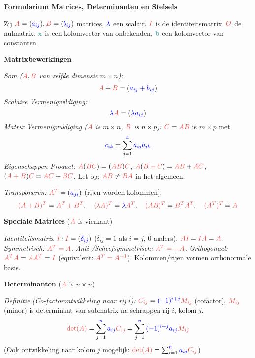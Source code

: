 \documentclass[12pt]{article}
\renewcommand{\vec}[1]{\textcolor{vectorTeal}{\mathbf{#1}}}
\newcommand{\scalar}[1]{\textcolor{scalarBrightBlue}{#1}}
\newcommand{\mat}[1]{\textcolor{matrixSoftRed}{#1}}
\begin{document}
\begin{center}
\Large \textbf{Formularium Matrices, Determinanten en Stelsels}
\end{center}

\vspace{1em} %

Zij $\mat{A} = (\scalar{a_{ij}}), \mat{B} = (\scalar{b_{ij}})$ matrices, $\scalar{\lambda}$ een scalair.
$\mat{I}$ is de identiteitsmatrix, $\mat{O}$ de nulmatrix.
$\vec{x}$ is een kolomvector van onbekenden, $\vec{b}$ een kolomvector van constanten.

\vspace{1.5em} %
{\centering
\textcolor{headerBrown}{\large\textbf{Matrixbewerkingen}}
\par
}%
\textit{Som ($\mat{A}, \mat{B}$ van zelfde dimensie $m \times n$):}
\[
\mat{A} + \mat{B} = (\scalar{a_{ij} + b_{ij}})
\]
\textit{Scalaire Vermenigvuldiging:}
\[
\scalar{\lambda} \mat{A} = (\scalar{\lambda a_{ij}})
\]
\textit{Matrix Vermenigvuldiging ($\mat{A}$ is $m \times n$, $\mat{B}$ is $n \times p$):} $\mat{C} = \mat{A}\mat{B}$ is $m \times p$ met
\[
\scalar{c_{ik}} = \sum_{j=1}^{\scalar{n}} \scalar{a_{ij} b_{jk}}
\]
\textit{Eigenschappen Product:} $\mat{A}(\mat{BC}) = (\mat{AB})\mat{C}$, $\mat{A}(\mat{B+C}) = \mat{AB} + \mat{AC}$, $(\mat{A+B})\mat{C} = \mat{AC} + \mat{BC}$. Let op: $\mat{AB} \neq \mat{BA}$ in het algemeen.

\textit{Transponeren:} $\mat{A^T} = (\scalar{a_{ji}})$ (rijen worden kolommen).
\[
\mat{(A+B)^T} = \mat{A^T + B^T}, \quad \mat{(\lambda A)^T} = \scalar{\lambda} \mat{A^T}, \quad \mat{(AB)^T} = \mat{B^T A^T}, \quad \mat{(A^T)^T} = \mat{A}
\]

\vspace{1.5em} %
{\centering
\textcolor{headerBrown}{\large\textbf{Speciale Matrices}} ($\mat{A}$ is vierkant)
\par
}%
\textit{Identiteitsmatrix $\mat{I}$:} $\mat{I} = (\scalar{\delta_{ij}})$ ($\delta_{ij} = 1$ als $i=j$, $0$ anders). $\mat{AI} = \mat{IA} = \mat{A}$.
\textit{Symmetrisch:} $\mat{A^T = A}$.
\textit{Anti-/Scheefsymmetrisch:} $\mat{A^T = -A}$.
\textit{Orthogonaal:} $\mat{A^T A} = \mat{A A^T} = \mat{I}$ (equivalent: $\mat{A^T = A^{-1}}$). Kolommen/rijen vormen orthonormale basis.

\vspace{1.5em} %
{\centering
\textcolor{headerBrown}{\large\textbf{Determinanten}} ($\mat{A}$ is $n \times n$)
\par
}%
\textit{Definitie (Co-factorontwikkeling naar rij $i$):} $\mat{C_{ij}} = \scalar{(-1)^{i+j}} \mat{M_{ij}}$ (cofactor), $\mat{M_{ij}}$ (minor) is determinant van submatrix na schrappen rij $i$, kolom $j$.
\[
\mat{\det(A)} = \sum_{j=1}^{\scalar{n}} \scalar{a_{ij}} \mat{C_{ij}} = \sum_{j=1}^{\scalar{n}} \scalar{(-1)^{i+j} a_{ij}} \mat{M_{ij}}
\]
(Ook ontwikkeling naar kolom $j$ mogelijk: $\mat{\det(A)} = \sum_{i=1}^{\scalar{n}} \scalar{a_{ij}} \mat{C_{ij}}$)
\end{document}
